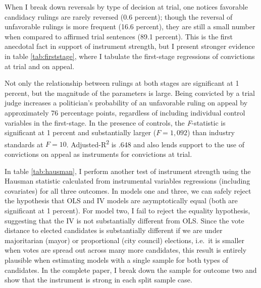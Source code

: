 \documentclass[11pt]{article}
\begin{document}
When I break down reversals by type of decision at trial, one notices favorable candidacy rulings are rarely reversed (0.6 percent); though the reversal of unfavorable rulings is more frequent (16.6 percent), they are still a small number when compared to affirmed trial sentences (89.1 percent). This is the first anecdotal fact in support of instrument strength, but I present stronger evidence in table \ref{tab:firststage}, where I tabulate the first-stage regressions of convictions at trial and on appeal.



Not only the relationship between rulings at both stages are significant at 1 percent, but the magnitude of the parameters is large. Being convicted by a trial judge increases a politician's probability of an unfavorable ruling on appeal by approximately 76 percentage points, regardless of including individual control variables in the first-stage. In the presence of controls, the \emph{F}-statistic is significant at 1 percent and substantially larger ($F = 1{,}092$) than industry standards at $F = 10$. Adjusted-R\textsuperscript{2} is .648 and also lends support to the use of convictions on appeal as instruments for convictions at trial.



In table \ref{tab:hausman}, I perform another test of instrument strength using the Hausman statistic calculated from instrumental variables regressions (including covariates) for all three outcomes. In models one and three, we can safely reject the hypothesis that OLS and IV models are asymptotically equal (both are significant at 1 percent). For model two, I fail to reject the equality hypothesis, suggesting that the IV is not substantially different from OLS. Since the vote distance to elected candidates is substantially different if we are under majoritarian (mayor) or proportional (city council) elections, i.e.~it is smaller when votes are spread out across many more candidates, this result is entirely plausible when estimating models with a single sample for both types of candidates. In the complete paper, I break down the sample for outcome two and show that the instrument is strong in each split sample case.
\end{document}
